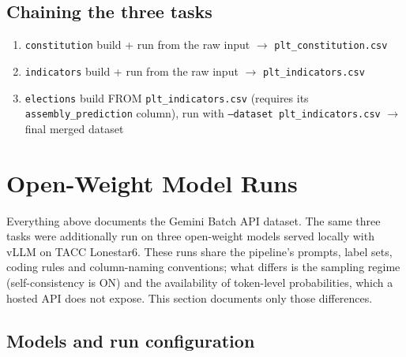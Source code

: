 \documentclass[11pt, a4paper]{article}
\begin{document}
\subsection{Chaining the three tasks}

\begin{enumerate}[leftmargin=1.4em]
  \item \texttt{constitution} build + run from the raw input $\rightarrow$ \texttt{plt\_constitution.csv}
  \item \texttt{indicators} build + run from the raw input $\rightarrow$ \texttt{plt\_indicators.csv}
  \item \texttt{elections} build FROM \texttt{plt\_indicators.csv} (requires its
    \texttt{assembly\_prediction} column), run with \texttt{--dataset plt\_indicators.csv} $\rightarrow$
    final merged dataset
\end{enumerate}

\section{Open-Weight Model Runs}
\label{sec:ow-runs}

Everything above documents the Gemini Batch API dataset. The same three tasks were
additionally run on three open-weight models served locally with vLLM on TACC
Lonestar6. These runs share the pipeline's prompts, label sets, coding rules and
column-naming conventions; what differs is the sampling regime (self-consistency is
ON) and the availability of token-level probabilities, which a hosted API does not
expose. This section documents only those differences.

\subsection{Models and run configuration}
\label{sec:ow-modelconfig}
\end{document}
